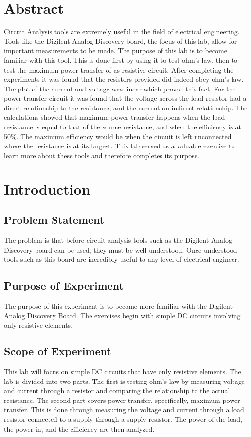\section{Abstract}
\label{sec:Abstract}
Circuit Analysis tools are extremely useful in the field of electrical engineering.
Tools like the Digilent Analog Discovery board, the focus of this lab, allow for important
measurements to be made. The purpose of this lab is to become familiar with this tool. This
is done first by using it to test ohm's law, then to test the maximum power transfer of
as resistive circuit. After completing the experiments it was found that the resistors
provided did indeed obey ohm's law. The plot of the current and voltage was linear which
proved this fact. For the power transfer circuit it was found that the voltage across
the load resistor had a direct relationship to the resistance, and the current an indirect
relationship. The calculations showed that maximum power transfer happens when the
load resistance is equal to that of the source resistance, and when the efficiency is at 50\%.
The maximum efficiency would be when the circuit is left unconnected where the resistance is
at its largest. This lab served as a valuable exercise to learn more about these tools and
therefore completes its purpose.


\section{Introduction}
\label{sec:Introduction}

\subsection{Problem Statement}
\label{sub:Problem Statement}
The problem is that before circuit analysis tools such as the Digilent Analog Discovery
board can be used, they must be well understood. Once understood tools such as this board are incredibly
useful to any level of electrical engineer.

\subsection{Purpose of Experiment}
\label{sub:Purpose of Experiment}
The purpose of this experiment is to become more familiar with the Digilent Analog Discovery Board.
The exercises begin with simple DC circuits involving only resistive elements.

\subsection{Scope of Experiment}
\label{sub:Scope of Experiment}
This lab will focus on simple DC circuits that have only resistive elements. The lab
is divided into two parts. The first is testing ohm's law by measuring voltage and
current through a resistor and comparing the relationship to the actual resistance.
The second part covers power transfer, specifically, maximum power transfer. This is done
through measuring the voltage and current through a load resistor connected to a supply
through a supply resistor. The power of the load, the power in, and the efficiency are
then analyzed.
